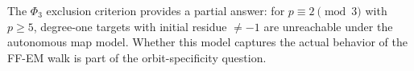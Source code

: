The $\Phi_3$ exclusion criterion provides a partial answer: for $p \equiv 2
\pmod{3}$ with $p \geq 5$, degree-one targets with initial residue
$\neq -1$ are unreachable under the autonomous map model. Whether this
model captures the actual behavior of the FF-EM walk is part of the
orbit-specificity question.

